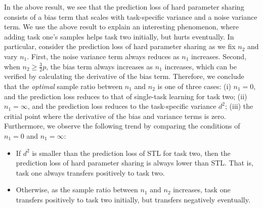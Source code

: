 \begin{example}
In the above result, we see that the prediction loss of hard parameter sharing consists of a bias term that scales with task-specific variance and a noise variance term.
We use the above result to explain an interesting phenomenon, where adding task one's samples helps task two initially, but hurts eventually.
In particular, consider the prediction loss of hard parameter sharing as we fix $n_2$ and vary $n_1$.
First, the noise variance term always reduces as $n_1$ increases.
Second, when $n_2 \ge \frac{3}{2} p$, the bias term always increases as $n_1$ increases, which can be verified by calculating the derivative of the bias term.
Therefore, we conclude that the \textit{optimal} sample ratio between $n_1$ and $n_2$ is one of three cases:
(i) $n_1 = 0$, and the prediction loss reduces to that of single-task learning for task two;
(ii) $n_1 = \infty$, and the prediction loss reduces to the task-specific variance $d^2$;
(iii) the critial point where the derivative of the bias and variance terms is zero.
Furthermore, we observe the following trend by comparing the conditions of $n_1 = 0$ and $n_1 = \infty$:
\begin{itemize}
	\item If $d^2$ is smaller than the prediction loss of STL for task two, then the prediction loss of hard parameter sharing is always lower than STL. That is, task one always transfers positively to task two.
	\item Otherwise, as the sample ratio between $n_1$ and $n_2$ increases, task one transfers positively to task two initially, but transfers negatively eventually.
\end{itemize}
\end{example}

